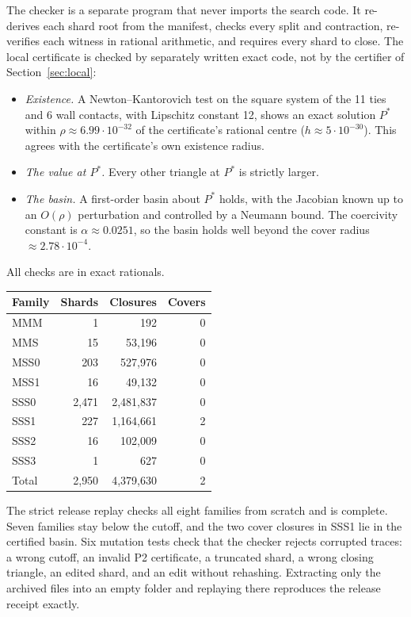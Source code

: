 \documentclass[11pt]{amsart}
\theoremstyle{definition}
\begin{document}
The checker is a separate program that never imports the search code. It re-derives each shard root from the manifest, checks every split and contraction, re-verifies each witness in rational arithmetic, and requires every shard to close. The local certificate is checked by separately written exact code, not by the certifier of Section~\ref{sec:local}:
\begin{itemize}
\item \emph{Existence.} A Newton--Kantorovich test on the square system of the 11 ties and 6 wall contacts, with Lipschitz constant 12, shows an exact solution $P^*$ within $\rho\approx6.99\cdot10^{-32}$ of the certificate's rational centre ($h\approx5\cdot10^{-30}$). This agrees with the certificate's own existence radius.
\item \emph{The value at $P^*$.} Every other triangle at $P^*$ is strictly larger.
\item \emph{The basin.} A first-order basin about $P^*$ holds, with the Jacobian known up to an $O(\rho)$ perturbation and controlled by a Neumann bound. The coercivity constant is $\alpha\approx0.0251$, so the basin holds well beyond the cover radius $\approx2.78\cdot10^{-4}$.
\end{itemize}
All checks are in exact rationals.

\begin{center}
\small
\begin{tabular}{lrrr}
\toprule
Family & Shards & Closures & Covers\\
\midrule
MMM &1&192&0\\
MMS &15&53{,}196&0\\
MSS0 &203&527{,}976&0\\
MSS1 &16&49{,}132&0\\
SSS0 &2{,}471&2{,}481{,}837&0\\
SSS1 &227&1{,}164{,}661&2\\
SSS2 &16&102{,}009&0\\
SSS3 &1&627&0\\
\midrule
Total &2{,}950&4{,}379{,}630&2\\
\bottomrule
\end{tabular}
\end{center}
The strict release replay checks all eight families from scratch and is complete. Seven families stay below the cutoff, and the two cover closures in SSS1 lie in the certified basin. Six mutation tests check that the checker rejects corrupted traces: a wrong cutoff, an invalid P2 certificate, a truncated shard, a wrong closing triangle, an edited shard, and an edit without rehashing. Extracting only the archived files into an empty folder and replaying there reproduces the release receipt exactly.
\end{document}
